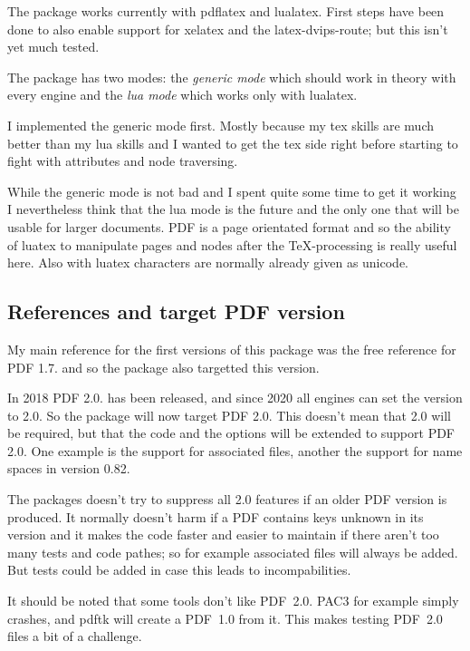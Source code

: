 \documentclass[DIV=12,parskip=half-,bibliography=totoc]{scrartcl}
\newcommand\PDF{PDF}
\begin{document}
The package works currently with pdflatex and lualatex. First steps have been done to also enable support for xelatex and the latex-dvips-route; but this isn't yet much tested.

The package has two modes: the \emph{generic mode} which should work in theory with every engine and the \emph{lua mode} which works only with lualatex.

I implemented the generic mode first. Mostly because my tex skills are much better than my lua skills and I wanted to get the tex side right before starting to fight with attributes and node traversing.

While the generic mode is not bad and I spent quite some time to get it working I nevertheless think that the lua mode is the future and the only one that will be usable for larger documents. \PDF{} is a page orientated format and so the ability of luatex to manipulate pages and nodes after the \TeX-processing is really useful here. Also with luatex characters are normally already given as unicode.


\subsection{References and target PDF version}

My main reference for the first versions of this package
was the free reference for \PDF{} 1.7. \parencite{pdfreference} and so the package also targetted this version.

In 2018 \PDF{} 2.0. has been released, and since 2020 all engines can set the version to 2.0. So the package will
now target \PDF{} 2.0. This doesn't mean that 2.0 will be required, but that the code and the options will be extended to
support \PDF{} 2.0. One example is the support for associated files, another the support for name spaces in version 0.82.

The packages doesn't try to suppress all 2.0 features if an older \PDF{} version is produced. It normally doesn't harm if a \PDF{} contains keys unknown in its version and it makes the code faster and easier to maintain if there aren't too many tests and code pathes; so for example associated files will always be added. But tests could be added in case this leads to incompabilities.

It should be noted that some tools don't like \PDF{}~2.0.  PAC3 for example simply crashes, and pdftk will create a \PDF{}~1.0 from it. This makes testing \PDF{}~2.0 files a bit of a challenge.
\end{document}
